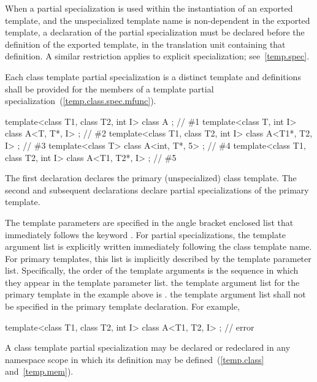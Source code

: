 \pnum
When a partial specialization is used within the instantiation of an
exported template, and the unspecialized template name is non-dependent
in the exported template, a declaration of the partial specialization
must be declared before the definition of the exported template, in the
translation unit containing that definition. A similar restriction applies
to explicit specialization; see~\ref{temp.spec}.

\pnum
Each class template partial specialization is a distinct template and
definitions shall be provided for the members of a template partial
specialization~(\ref{temp.class.spec.mfunc}).

\pnum
\enterexample
\begin{codeblock}
template<class T1, class T2, int I> class A             { };    // \#1
template<class T, int I>            class A<T, T*, I>   { };    // \#2
template<class T1, class T2, int I> class A<T1*, T2, I> { };    // \#3
template<class T>                   class A<int, T*, 5> { };    // \#4
template<class T1, class T2, int I> class A<T1, T2*, I> { };    // \#5
\end{codeblock}

The first declaration declares the primary (unspecialized) class template.
The second and subsequent declarations declare partial specializations of
the primary template.
\exitexample

\pnum
The template parameters are specified in the angle bracket enclosed list
that immediately follows the keyword
.
For partial specializations, the template argument list is explicitly
written immediately following the class template name.
For primary templates, this list is implicitly described by the
template parameter list.
Specifically, the order of the template arguments is the sequence in
which they appear in the template parameter list.
\enterexample
the template argument list for the primary template in the example
above is
.
\exitexample
\enternote
the template argument list shall not be specified in the primary template
declaration.
For example,

\begin{codeblock}
template<class T1, class T2, int I> class A<T1, T2, I>  { };    // error
\end{codeblock}
\exitnoteb

\pnum
A class template partial specialization may be declared or redeclared in any
namespace scope in which its definition may be defined~(\ref{temp.class} and~\ref{temp.mem}).
\enterexample

